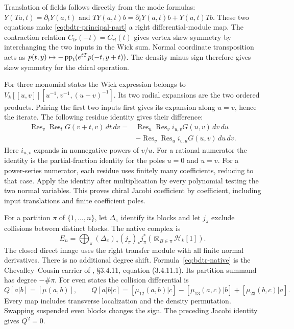 Translation of fields follows directly from the mode formulas:
$Y(Ta,t)=\partial_tY(a,t)$ and
$TY(a,t)b=\partial_tY(a,t)b+Y(a,t)Tb$.
These two equations make \eqref{eq:bdtr-principal-part} a right differential-module map.
The contraction relation $C_{lr}(-t)=C_{rl}(t)$ gives vertex skew symmetry by interchanging the two inputs in the Wick sum.
Normal coordinate transposition acts as
$p(t,y)\mapsto-\operatorname{pp}_t(e^{tT}p(-t,y+t))$.
The density minus sign therefore gives skew symmetry for the chiral operation.

For three monomial states the Wick expression belongs to
$V_k[[u,v]][u^{-1},v^{-1},(u-v)^{-1}]$.
Its two radial expansions are the two ordered products.
Pairing the first two inputs first gives its expansion along $u=v$, hence the iterate.
The following residue identity gives their difference:
\[
 \begin{aligned}
 \operatorname{Res}_v\operatorname{Res}_t G(v+t,v)\,dt\,dv
 ={}&\operatorname{Res}_u\operatorname{Res}_v i_{u,v}G(u,v)\,dv\,du\\
    &-\operatorname{Res}_v\operatorname{Res}_u i_{v,u}G(u,v)\,du\,dv.
 \end{aligned}
\]
Here $i_{u,v}$ expands in nonnegative powers of $v/u$.
For a rational numerator the identity is the partial-fraction identity for the poles $u=0$ and $u=v$.
For a power-series numerator, each residue uses finitely many coefficients, reducing to that case.
Apply the identity after multiplication by every polynomial testing the two normal variables.
This proves chiral Jacobi coefficient by coefficient, including input translations and finite coefficient poles.

For a partition $\pi$ of $\{1,\ldots,n\}$, let $\Delta_\pi$ identify its blocks and let $j_\pi$ exclude collisions between distinct blocks.
The native complex is
\begin{equation}\label{eq:bdtr-native}
 E_n=\bigoplus_\pi (\Delta_\pi)_*(j_\pi)_*j_\pi^*
       \left(\boxtimes_{B\in\pi}\mathcal H_k[1]\right).
\end{equation}
The closed direct image uses the right transfer module with all finite normal derivatives.
There is no additional degree shift.
Formula~\eqref{eq:bdtr-native} is the Chevalley--Cousin carrier of
\cite{BDtranslated}, \S3.4.11, equation (3.4.11.1).
Its partition summand has degree $-\#\pi$.
For even states the collision differential is
\begin{equation}\label{eq:bdtr-Q-signs}
 Q[a|b]=[\mu(a,b)],\qquad
 Q[a|b|c]=[\mu_{12}(a,b)|c]-[\mu_{13}(a,c)|b]
                                  +[\mu_{23}(b,c)|a].
\end{equation}
Every map includes transverse localization and the density permutation.
Swapping suspended even blocks changes the sign.
The preceding Jacobi identity gives $Q^2=0$.

